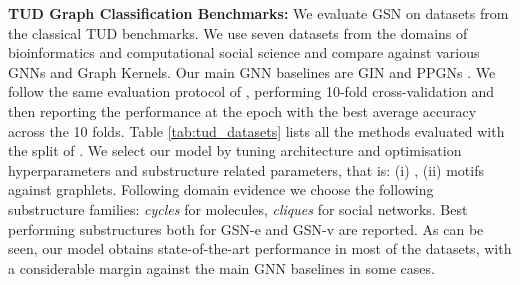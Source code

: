 \documentclass{article} \usepackage{iclr2021_conference,times}
\begin{document}
\noindent\textbf{TUD Graph Classification Benchmarks:}\label{TUD}
We evaluate GSN on datasets from the classical TUD benchmarks. We use seven datasets from the  domains of bioinformatics and computational social science and compare against various GNNs and Graph Kernels. Our main GNN baselines are GIN \cite{xu2018how} and PPGNs \cite{maron2019provably}. We follow the same evaluation protocol of \cite{xu2018how}, performing 10-fold cross-validation and then reporting the performance at the epoch with the best average accuracy across the 10 folds. Table \ref{tab:tud_datasets} lists all the methods evaluated with the split of \cite{zhang2018end}. We select our model by tuning architecture and optimisation hyperparameters and substructure related parameters, that is: (i) , (ii) motifs against graphlets. Following domain evidence we choose the following substructure families: \textit{cycles} for molecules, \textit{cliques} for social networks. Best performing substructures both for GSN-e and GSN-v are reported. As can be seen, our model obtains state-of-the-art performance in most of the datasets, with a considerable margin against the main GNN baselines in some cases. 
    
\end{document}
